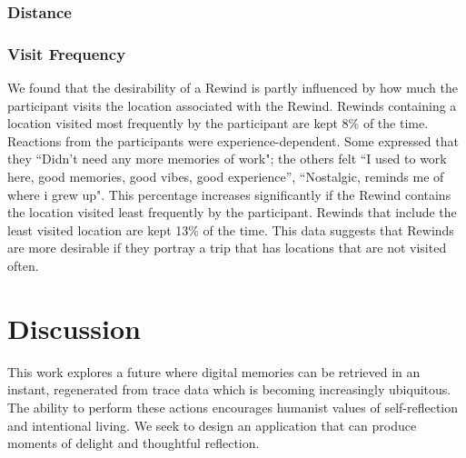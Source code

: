 \documentclass{sigchi}
\begin{document}
\subsubsection{Distance}

\subsubsection{Visit Frequency}
We found that the desirability of a Rewind is partly influenced by how much the participant visits the location associated with the Rewind. Rewinds containing a location visited most frequently by the participant are kept 8\% of the time. Reactions from the participants were experience-dependent.
Some expressed that they ``Didn't need any more memories of work"; the others felt ``I used to work here, good memories, good vibes, good experience'', ``Nostalgic, reminds me of where i grew up". This percentage increases significantly if the Rewind contains the location visited least frequently by the participant. Rewinds that include the least visited location are kept 13\% of the time. This data suggests that Rewinds are more desirable if they portray a trip that has locations that are not visited often.


\section{Discussion}
This work explores a future where digital memories can be retrieved in an instant, regenerated from trace data which is becoming increasingly ubiquitous. The ability to perform these actions encourages humanist values of self-reflection and intentional living. We seek to design an application that can produce moments of delight and thoughtful reflection.
\end{document}
